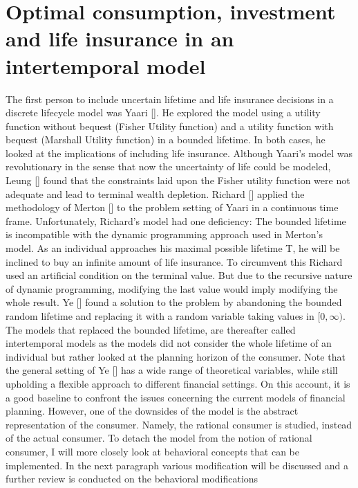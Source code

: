 \documentclass[letterpaper,10pt,english]{jupyterBook}
\begin{document}
\section{Optimal consumption, investment and life insurance in an intertemporal model}
\label{\detokenize{Financial_application:optimal-consumption-investment-and-life-insurance-in-an-intertemporal-model}}
\sphinxAtStartPar
The first person to include uncertain lifetime and life insurance decisions in a discrete life\sphinxhyphen{}cycle model was Yaari {[}{]}. He explored the model using a utility function without bequest (Fisher Utility function) and a utility function with bequest (Marshall Utility function) in a bounded lifetime. In both cases, he looked at the implications of including life insurance. Although Yaari’s model was revolutionary in the sense that now the uncertainty of life could be modeled, Leung {[}{]} found that the constraints laid upon the Fisher utility function were not adequate and lead to terminal wealth depletion. Richard {[}{]} applied the methodology of Merton {[}{]} to the problem setting of Yaari in a continuous time frame. Unfortunately, Richard’s model had one deficiency: The bounded lifetime is incompatible with the dynamic programming approach used in Merton’s model. As an individual approaches his maximal possible lifetime T, he will be inclined to buy an infinite amount of life insurance. To circumvent this Richard used an artificial condition on the terminal value. But due to the recursive nature of dynamic programming, modifying the last value would imply modifying the whole result. Ye {[}{]}  found a solution to the problem by abandoning the bounded random lifetime and replacing it with a random variable taking values in \([0,\infty)\). The models that replaced the bounded lifetime, are thereafter called intertemporal models as the models did not consider the whole lifetime of an individual but rather looked at the planning horizon of the consumer.  Note that the general setting of Ye {[}{]} has a wide range of theoretical variables, while still upholding a flexible approach to different financial settings. On this account, it is a good baseline to confront the issues concerning the current models of financial planning. However, one of the downsides of the model is the abstract representation of the consumer. Namely, the rational consumer is studied, instead of the actual consumer. To detach the model from the notion of rational consumer, I will more closely look at behavioral concepts that can be implemented. In the next paragraph various modification will be discussed and a further review is conducted on the behavioral modifications
\end{document}

